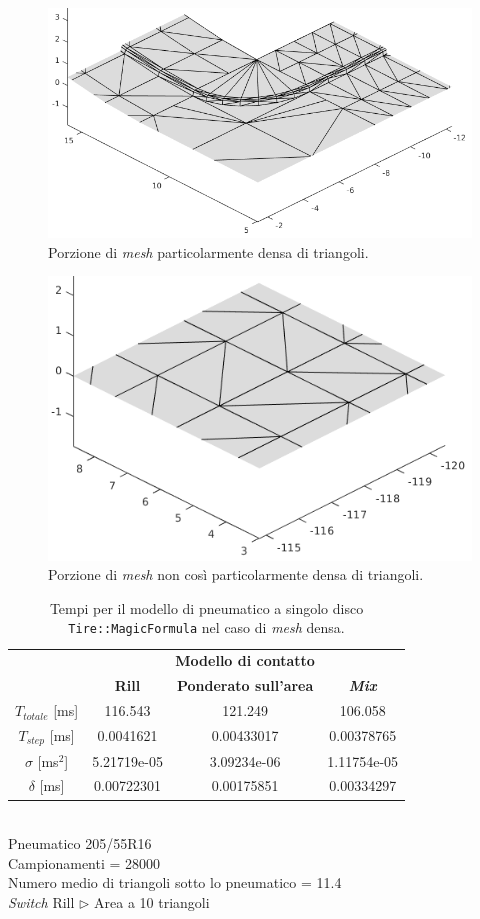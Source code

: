 \begin{figure}[h!]
	\centering
	\includegraphics[width=0.7\linewidth]{Figures/mesh_dense}
	\caption{Porzione di \textit{mesh} particolarmente densa di triangoli.}
	\label{meshdense}
\end{figure}
\begin{figure}[h!]
	\centering
	\includegraphics[width=0.7\linewidth]{Figures/mesh_notsodense}
	\caption{Porzione di \textit{mesh} non così particolarmente densa di triangoli.}
	\label{meshnotsodense}
\end{figure}
%
\clearpage
%
\begin{table}
	\centering
	\begin{tabular}{c|c|c|c|}
		\cline{2-4} 
		& \multicolumn{3}{c|}{\textbf{Modello di contatto}} \\
		\cline{2-4} 
		& \textbf{Rill} & \textbf{Ponderato sull'area} & \textbf{\textit{Mix}} \\ 
		\hline
		\multicolumn{1}{|c|}{$T_{totale}$ [ms]} & 116.543 & 121.249 & 106.058 \\ 
		\hline 
		\multicolumn{1}{|c|}{$T_{step}$ [ms]} & 0.0041621 & 0.00433017 & 0.00378765 \\ 
		\hline 
		\multicolumn{1}{|c|}{$\sigma$ [ms$^2$]} & 5.21719e-05 & 3.09234e-06 & 1.11754e-05 \\ 
		\hline 
		\multicolumn{1}{|c|}{$\delta$ [ms]} & 0.00722301 & 0.00175851 & 0.00334297 \\ 
		\hline 
	\end{tabular}
	\\[0.5cm]
	Pneumatico 205/55R16\\
	Campionamenti = 28000\\
	Numero medio di triangoli sotto lo pneumatico = 11.4\\
	\textit{Switch} Rill $\triangleright$ Area a 10 triangoli
	\caption{Tempi per il modello di pneumatico a singolo disco \texttt{Tire::MagicFormula} nel caso di \textit{mesh} densa.}
	\label{MFcordolo}
\end{table}
